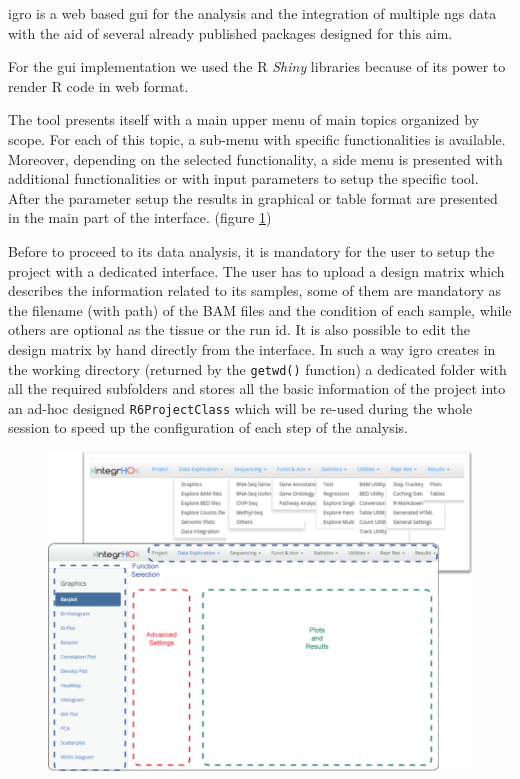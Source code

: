 \gls{igro} is a web based \gls{gui} for the analysis and the integration of multiple \gls{ngs} data with the aid of several already published packages designed for this aim. 

For the \gls{gui} implementation we used the R \textit{Shiny} libraries because of its power to render R code in web format.

The tool presents itself with a main upper menu of main topics organized by scope. For each of this topic, a sub-menu with specific functionalities is available.
Moreover, depending on the selected functionality, a side menu is presented with additional functionalities or with input parameters to setup the specific tool.
After the parameter setup the results in graphical or table format are presented in the main part of the interface. (figure \ref{fig:integrhomain})

Before to proceed to its data analysis, it is mandatory for the user to setup the project with a dedicated interface. 
The user has to upload a design matrix which describes the information related to its samples, some of them are mandatory as the filename (with path) of the BAM files and the condition of each sample, while others are optional as the tissue or the run id. It is also possible to edit the design matrix by hand directly from the interface.
In such a way \gls{igro} creates in the working directory (returned by the \lstinline!getwd()! function) a dedicated folder with all the required subfolders and stores all the basic information of the project into an ad-hoc designed \lstinline!R6ProjectClass! which will be re-used during the whole session to speed up the configuration of each step of the analysis.

\begin{figure}[H]
\includegraphics[width=\textwidth,height=\textheight,keepaspectratio]{img/integrho/general_description.png}
\caption[integrho main interface]{}
\label{fig:integrhomain}
\centering
\end{figure}
 
